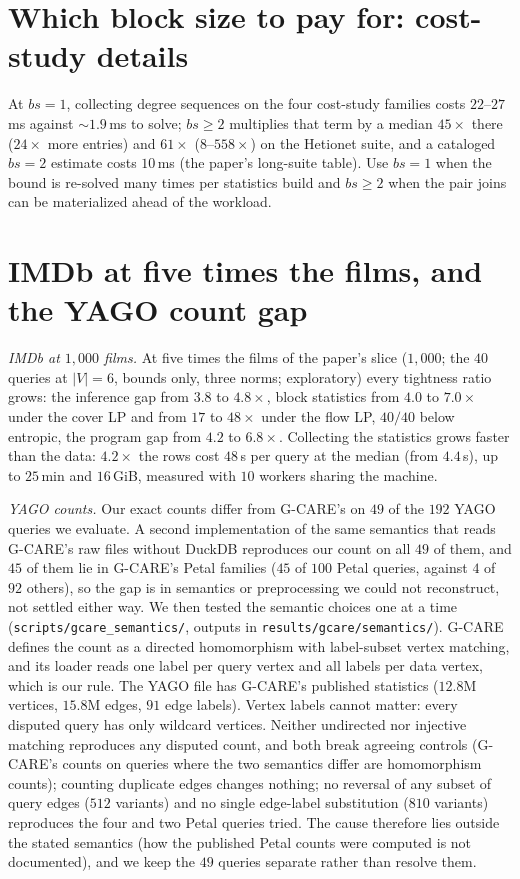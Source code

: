 \documentclass[11pt]{article}
\begin{document}
\section{Which block size to pay for: cost-study details}
At $bs{=}1$, collecting degree sequences on the four cost-study families
costs $22$--$27$\,ms against ${\sim}1.9$\,ms to solve; $bs{\ge}2$
multiplies that term by a median $45\times$ there ($24\times$ more
entries) and $61\times$ ($8$--$558\times$) on the Hetionet suite, and a
cataloged $bs{=}2$ estimate costs $10$\,ms (the paper's long-suite table).
Use $bs{=}1$ when the bound is re-solved many times per statistics build
and $bs{\ge}2$ when the pair joins can be materialized ahead of the
workload.


\section{IMDb at five times the films, and the YAGO count gap}
\emph{IMDb at $1{,}000$ films.} At five times the films of the paper's slice ($1{,}000$; the $40$ queries at
$|V|{=}6$, bounds only, three norms; exploratory) every tightness ratio
grows: the inference gap from $3.8$ to $4.8\times$, block statistics from
$4.0$ to $7.0\times$ under the cover LP and from $17$ to $48\times$ under
the flow LP, $40/40$ below entropic, the program gap from $4.2$ to
$6.8\times$. Collecting the statistics grows faster than the data:
$4.2\times$ the rows cost $48$\,s per query at the median (from
$4.4$\,s), up to $25$\,min and $16$\,GiB, measured with $10$ workers
sharing the machine.

\emph{YAGO counts.} Our exact counts differ from G-CARE's on $49$ of the $192$ YAGO queries we evaluate. A
second implementation of the same semantics that reads G-CARE's raw files
without DuckDB reproduces our count on all $49$ of them, and $45$ of them lie in
G-CARE's Petal families ($45$ of $100$ Petal queries, against $4$ of $92$
others), so the gap is in semantics or preprocessing we could not reconstruct, not settled either way.
We then tested the semantic choices one at a time (\texttt{scripts/gcare\_semantics/},
outputs in \texttt{results/gcare/semantics/}). G-CARE defines the count as a
directed homomorphism with label-subset vertex matching, and its loader reads
one label per query vertex and all labels per data vertex, which is our rule.
The YAGO file has G-CARE's published statistics ($12.8$M vertices, $15.8$M
edges, $91$ edge labels). Vertex labels cannot matter: every disputed query has
only wildcard vertices. Neither undirected nor injective matching reproduces
any disputed count, and both break agreeing controls (G-CARE's counts on queries
where the two semantics differ are homomorphism counts); counting duplicate
edges changes nothing; no reversal of any subset of query edges ($512$
variants) and no single edge-label substitution ($810$ variants) reproduces
the four and two Petal queries tried. The cause therefore lies outside the
stated semantics (how the published Petal counts were computed is not
documented), and we keep the $49$ queries separate rather than resolve them.
\end{document}
